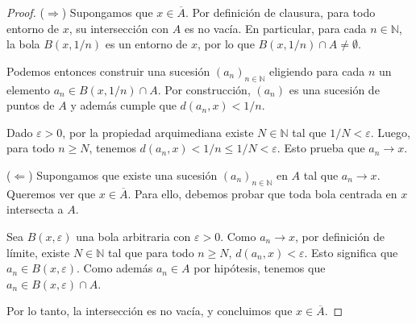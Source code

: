 \begin{proof}
	($\Rightarrow$) Supongamos que $x \in \overline{A}$. Por definición de clausura, para todo entorno de $x$, su intersección con $A$ es no vacía. En particular, para cada $n \in \mathbb{N}$, la bola $B(x, 1/n)$ es un entorno de $x$, por lo que $B(x, 1/n) \cap A \neq \emptyset$.

	Podemos entonces construir una sucesión $(a_n)_{n \in \mathbb{N}}$ eligiendo para cada $n$ un elemento $a_n \in B(x, 1/n) \cap A$. Por construcción, $(a_n)$ es una sucesión de puntos de $A$ y además cumple que $d(a_n, x) < 1/n$.

	Dado $\varepsilon > 0$, por la propiedad arquimediana existe $N \in \mathbb{N}$ tal que $1/N < \varepsilon$. Luego, para todo $n \geq N$, tenemos $d(a_n, x) < 1/n \leq 1/N < \varepsilon$. Esto prueba que $a_n \to x$.

	($\Leftarrow$) Supongamos que existe una sucesión $(a_n)_{n \in \mathbb{N}}$ en $A$ tal que $a_n \to x$. Queremos ver que $x \in \overline{A}$. Para ello, debemos probar que toda bola centrada en $x$ intersecta a $A$.

	Sea $B(x, \varepsilon)$ una bola arbitraria con $\varepsilon > 0$. Como $a_n \to x$, por definición de límite, existe $N \in \mathbb{N}$ tal que para todo $n \ge N$, $d(a_n, x) < \varepsilon$. Esto significa que $a_n \in B(x, \varepsilon)$. Como además $a_n \in A$ por hipótesis, tenemos que $a_n \in B(x, \varepsilon) \cap A$.

	Por lo tanto, la intersección es no vacía, y concluimos que $x \in \overline{A}$.
\end{proof}

